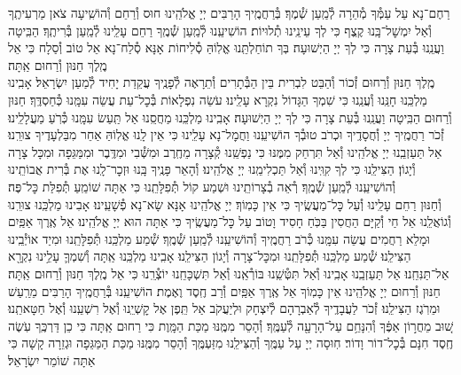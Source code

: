 \documentclass[twoside, openany, parskip=half, 11pt]{book}
\begin{document}
רַחֶם־נָא עַל עַמְּ֯ךָ מְ֯הֵרָה לְ֯מַֽעַן שְׁ֯מֶךָ׃ בְּ֯רַחֲמֶֽיךָ הָרַבִּים יְיָ אֱלֹהֵֽינוּ חוּס וְ֯רַחֵם וְ֯הוֹשִֽׁיעָה צֹאן מַרְעִיתֶֽךָ וְ֯אַל יִמְשׇׁל־בָּֽנוּ קֶֽצֶף כִּי לְךָ עֵינֵֽינוּ תְ֯לוּיוֹת׃ הוֹשִׁיעֵֽנוּ לְ֯מַֽעַן שְׁ֯מֶֽךָ רַחֵם עָלֵֽינוּ לְ֯מַֽעַן בְּ֯רִיתֶֽךָ׃ הַבִּֽיטָה וַעֲנֵֽנוּ בְּ֯עֵת צָרָה כִּי לְךָ יְיָ הַיְשׁוּעָה׃ בְּךָ תוֹחַלְתֵּֽנוּ אֱלֽוֹהַּ סְ֯לִיחוֹת אָנָּא סְ֯לַח־נָא אֵל טוֹב וְ֯סַלָח כִּי אֵל מֶֽלֶךְ חַנּוּן וְ֯רַחוּם אַֽתָּה׃\\
מֶֽלֶךְ חַנּוּן וְ֯רַחוּם זְ֯כוֹר וְ֯הַבֵּט לִבְרִית בֵּין הַבְּ֯תָרִים וְ֯תֵרָאֶה לְ֯פָנֶֽיךָ עֲקֵדַת יָחִיד לְ֯מַעַן יִשְׂרָאֵל׃ אָבִֽינוּ מַלְכֵּֽנוּ חָנֵּֽנוּ וְ֯עֲנֵֽנוּ כִּי שִׁמְךָ הַגָּדוֹל נִקְרָא עָלֵֽינוּ׃ עֹשֵׂה נִפְלָאוֹת בְּ֯כׇל־עֵת עֲשֵׂה עִמָּֽנוּ כְּ֯חַסְדֶּֽךָ׃ חַנּוּן וְ֯רַחוּם הַבִּֽיטָה וַעֲנֵֽנוּ בְּ֯עֵת צָרָה כִּי לְךָ יְיָ הַיְשׁוּעָה׃ אָבִֽינוּ מַלְכֵּֽנוּ מַחֲסֵֽנוּ אַל תַּֽעַשׂ עִמָּֽנוּ כְּ֯רֹֽעַ מַעֲלָלֵֽינוּ׃ זְ֯כֹר רַחֲמֶֽיךָ יְיָ וְ֯חֲסָדֶֽיךָ וּכְרֹב טוּבְ֯ךָ הוֹשִׁיעֵֽנוּ וַחֲמׇל־נָא עָלֵֽינוּ כִּי אֵין לָֽנוּ אֱלֽוֹהַּ אַחֵר מִבַּלְעָדֶיךָ צוּרֵֽנוּ׃ אַל תַּעַזְבֵֽנוּ יְיָ אֱלֹהֵֽינוּ וְ֯אַל תִּרְחַק מִמֶּנּוּ כִּי נַפְשֵֽׁנוּ קְ֯צָרָה מֵחֶֽרֶב וּמִשְּׁ֯בִי וּמִדֶּֽבֶר וּמִמַּגֵּפָה וּמִכָּל צָרָה וְ֯יָגוֹן׃ הַצִּילֵֽנוּ כִּי לְךָ קִוִּֽינוּ וְ֯אַל תַּכְלִימֵֽנוּ יְיָ אֱלֹהֵֽינוּ׃ וְ֯הָאֵר פָּנֶֽיךָ בָּֽנוּ וּזְכׇר־לָֽנוּ אֶת בְּ֯רִית אֲבוֹתֵֽינוּ וְ֯הוֹשִׁיעֵֽנוּ לְ֯מַֽעַן שְׁ֯מֶֽךָ׃ רְ֯אֵה בְ֯צָרוֹתֵֽינוּ וּשְׁמַע קוֹל תְּ֯פִלָּתֵֽנוּ כִּי אַתָּה שׁוֹמֵֽעַ תְּ֯פִלַּת כׇּל־פֶּה׃\\
וְ֯חַנּוּן רַחֵם עָלֵֽינוּ וְ֯עַל כׇּל־מַעֲשֶֽׂיךָ כִּי אֵין כָּמֽוֹךָ׃ יְיָ אֱלֹהֵֽינוּ אָנָּא שָׂא־נָא פְ֯שָׁעֵֽינוּ׃ אָבִינוּ מַלְכֵּֽנוּ צוּרֵֽנוּ וְ֯גוֹאֲלֵֽנוּ אֵל חַי וְ֯קַיָּם הַחֲסִין בַּכֹּֽחַ חָסִיד וָטוֹב עַל כׇּל־מַעֲשֶֽׂיךָ כִּי אַתָּה הוּא יְיָ אֱלֹהֵֽינוּ׃ אֵל אֶֽרֶךְ אַפַּֽיִם וּמָלֵא רַחֲמִים עֲשֵׂה עִמָּֽנוּ כְּ֯רֹב רַחֲמֶֽיךָ וְ֯הוֹשִׁיעֵֽנוּ לְ֯מַֽעַן שְׁ֯מֶֽךָ׃ שְׁ֯מַע מַלְכֵּֽנוּ תְּ֯פִלָּתֵֽנוּ וּמִיַד אוֹיְ֯בֵֽינוּ הַצִּילֵֽנוּ׃ שְׁ֯מַע מַלְכֵּֽנוּ תְּ֯פִלָּתֵֽנוּ וּמִכׇּל־צָרָה וְ֯יָגוֹן הַצִּילֵֽנוּ׃ אָבִֽינוּ מַלְכֵּֽנוּ אַֽתָּה וְ֯שִׁמְךָ֛ עָלֵ֥ינוּ נִקְרָ֖א אַל־תַּנִּחֵֽנוּ׃ אַל תַּעַזְבֵֽנוּ אָבִֽינוּ וְ֯אַל תִּטְּ֯שֵֽׁנוּ בּוֹרְ֯אֵֽנוּ וְ֯אַל תִּשְׁכָּחֵֽנוּ יוֹצְ֯רֵֽנוּ כִּי אֵל מֶֽלֶךְ חַנּוּן וְ֯רַחוּם אַֽתָּה׃\\
חַנּוּן וְ֯רַחוּם יְיָ אֱלֹהֵֽינוּ אֵין כָּמֽוֹךָ אֵל אֶֽרֶךְ אַפַּֽיִם וְ֯רַב חֶֽסֶד וֶאֶמֶת׃ הוֹשִׁיעֵֽנוּ בְּ֯רַחֲמֶֽיךָ הָרַבִּים מֵרַֽעַשׁ וּמֵרֹֽגֶז הַצִּילֵֽנוּ׃ זְ֯כֹר לַעֲבָדֶֽיךָ לְ֯אַבְרָהָם לְ֯יִצְחָק וּלְיַעֲקֹב אַל תֵּֽפֶן אֶל קׇשְׁיֵֽנוּ וְ֯אֶל רִשְׁעֵֽנוּ וְ֯אֶל חַטָּאתֵֽנוּ׃
שׁ֚וּב מֵחֲר֣וֹן אַפֶּ֔ךָ וְ֯הִנָּחֵ֥ם עַל־הָרָעָ֖ה לְ֯עַמֶּֽךָ׃ וְ֯הָסֵר מִמֶּֽנּוּ מַכַּת הַמָּֽוֶת כִּי רַחוּם אַֽתָּה כִּי כֵן דַּרְכֶּֽךָ עֹֽשֶׂה חֶֽסֶד חִנָּם בְּ֯כׇל־דוֹר וָדוֹר׃ חֽוּסָה יְיָ עַל עַמֶּֽךָ וְ֯הַצִּילֵֽנוּ מִזַּעְמֶּֽךָ וְ֯הָסֵר מִמֶּֽנּוּ מַכַּת הַמַּגֵּפָה וּגְזֵרָה קָשָׁה כִּי אַתָּה שׁוֹמֵר יִשְׂרָאֵל׃
\end{document}
